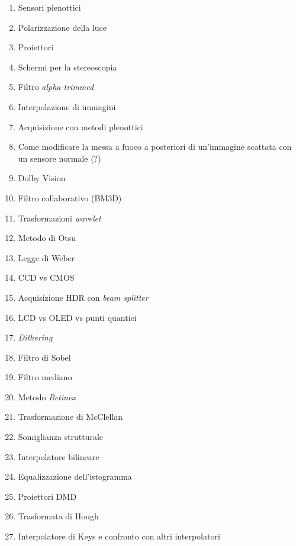 \documentclass[a4paper,11pt]{article}
\begin{document}
\begin{appendices}
\begin{enumerate}
    \item Sensori plenottici
    \item Polarizzazione della luce
    \item Proiettori
    \item Schermi per la stereoscopia
    \item Filtro \textit{alpha-trimmed}
    \item Interpolazione di immagini
    \item Acquisizione con metodi plenottici
    \item Come modificare la messa a fuoco a posteriori di un'immagine scattata con un sensore normale (?)
    \item Dolby Vision
    \item Filtro collaborativo (BM3D)
    \item Trasformazioni \textit{wavelet}
    \item Metodo di Otsu
    \item Legge di Weber
    \item CCD vs CMOS
    \item Acquisizione HDR con \textit{beam splitter}
    \item LCD vs OLED vs punti quantici
    \item \textit{Dithering}
    \item Filtro di Sobel
    \item Filtro mediano
    \item Metodo \textit{Retinex}
    \item Trasformazione di McClellan
    \item Somiglianza strutturale
    \item Interpolatore bilineare
    \item Equalizzazione dell'istogramma
    \item Proiettori DMD
    \item Trasformata di Hough
    \item Interpolatore di Keys e confronto con altri interpolatori
\end{enumerate}


\end{appendices}
\end{document}
